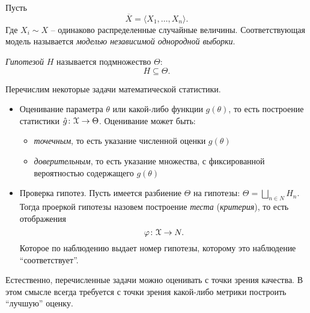 \begin{definition}
	Пусть
	\[
		\overline{X} = \langle X_1, \ldots, X_n \rangle
	.\]
	Где $X_i \sim X$ -- одинаково распределенные случайные величины.
	Соответствующая модель называется \textit{моделью независимой
	однородной выборки}.
\end{definition}

\begin{definition}
	\textit{Гипотезой} $H$ называется подмножество $\Theta$:
	\[
		H \subseteq \Theta
	.\]
\end{definition}

Перечислим некоторые задачи математической статистики.
\begin{itemize}
	\item Оценивание параметра $\theta$ или какой-либо функции $g(\theta)$,
		то есть построение статистики $\hat{g} \colon \mathcal{X} \to \Theta$.
		Оценивание может быть:
		\begin{itemize}
			\item \textit{точечным}, то есть указание численной оценки
				$g(\theta)$
			\item \textit{доверительным}, то есть указание множества, с
				фиксированной вероятностью содержащего $g(\theta)$
		\end{itemize}
	\item Проверка гипотез. Пусть имеется разбиение $\Theta$ на гипотезы:
		$\Theta = \bigsqcup_{n \in N}{H_n}$. Тогда проеркой гипотезы назовем
		построение \textit{теста} (\textit{критерия}), то есть отображения
		\[
			\varphi \colon \mathcal{X} \to N
		.\]
		Которое по наблюдению выдает номер гипотезы, которому это наблюдение
		``соответствует''.
\end{itemize}

Естественно, перечисленные задачи можно оценивать с точки зрения качества.
В этом смысле всегда требуется с точки зрения какой-либо метрики  построить
``лучшую'' оценку.


